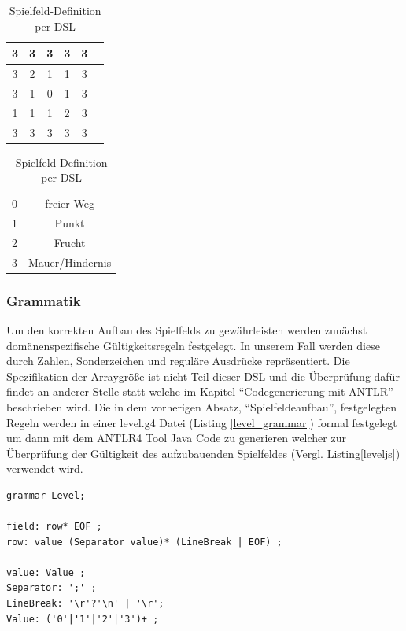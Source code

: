 \documentclass[conference]{IEEEtran}
\begin{document}
\begin{table}[!t]
\caption{Spielfeld-Definition per DSL}
\label{gameboard_dsl}
\centering
\begin{tabular}{|c|c|c|c|c|c|}
\hline
3 & 3 & 3 & 3 & 3\\
\hline
3 & 2 & 1 & 1 & 3\\
\hline
3 & 1 & 0 & 1 & 3\\
\hline
1 & 1 & 1 & 2 & 3\\
\hline
3 & 3 & 3 & 3 & 3\\
\hline
\end{tabular}
\begin{tabular}{|c|c|}
0 & freier Weg\\
1 & Punkt\\
2 & Frucht\\
3 & Mauer/Hindernis
\end{tabular}
\end{table}


\subsubsection{Grammatik}
Um den korrekten Aufbau des Spielfelds zu gewährleisten werden zunächst domänenspezifische Gültigkeitsregeln festgelegt. In unserem Fall werden diese durch Zahlen, Sonderzeichen und reguläre Ausdrücke repräsentiert. Die Spezifikation der Arraygröße ist nicht Teil dieser DSL und die Überprüfung dafür findet an anderer Stelle statt welche im Kapitel “Codegenerierung mit ANTLR” beschrieben wird. Die in dem vorherigen Absatz, “Spielfeldeaufbau”, festgelegten Regeln werden in einer level.g4 Datei (Listing \ref{level_grammar}) formal festgelegt um dann mit dem ANTLR4 Tool Java Code zu generieren welcher zur Überprüfung der Gültigkeit des aufzubauenden Spielfeldes (Vergl. Listing\ref{leveljs}) verwendet wird.

\begin{lstlisting}[captionpos=b, caption={Auszug aus der DSL spezifizierenden Grammatik level.g4}, label=level_grammar]
grammar Level;

field: row* EOF ;
row: value (Separator value)* (LineBreak | EOF) ;

value: Value ;
Separator: ';' ;
LineBreak: '\r'?'\n' | '\r';
Value: ('0'|'1'|'2'|'3')+ ;
\end{lstlisting}
\end{document}
